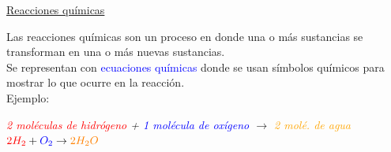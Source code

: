         \begin{center} \underline{Reacciones químicas} \end{center}
            \indent Las reacciones químicas son un proceso en donde una o más sustancias se transforman en una o más nuevas sustancias. \\
            \indent Se representan con \textcolor{blue}{ecuaciones químicas} donde se usan símbolos químicos para mostrar lo que ocurre en la reacción. \\
            \indent Ejemplo:
            \begin{center}
                \textit{\textcolor{red}{2 moléculas de hidrógeno} + \textcolor{blue}{1 molécula de oxígeno} $\rightarrow$ \textcolor{orange}{2 molé. de agua}} \\[5pt]
                $\textcolor{red}{2H_2} + \textcolor{blue}{O_2} \rightarrow \textcolor{orange}{2H_2O}$
            \end{center}


